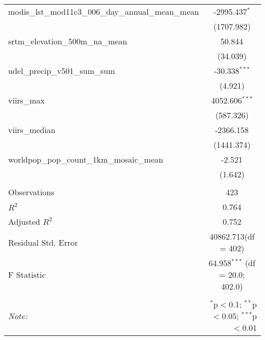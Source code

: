 \begin{table}[!htbp]
\begin{tabular}{@{\extracolsep{5pt}}lc}
 modis_lst_mod11c3_006_day_annual_mean_mean & -2995.437$^{*}$ \\
  & (1707.982) \\
 srtm_elevation_500m_na_mean & 50.844$^{}$ \\
  & (34.039) \\
 udel_precip_v501_sum_sum & -30.338$^{***}$ \\
  & (4.921) \\
 viirs_max & 4052.606$^{***}$ \\
  & (587.326) \\
 viirs_median & -2366.158$^{}$ \\
  & (1441.374) \\
 worldpop_pop_count_1km_mosaic_mean & -2.521$^{}$ \\
  & (1.642) \\
\hline \\[-1.8ex]
 Observations & 423 \\
 $R^2$ & 0.764 \\
 Adjusted $R^2$ & 0.752 \\
 Residual Std. Error & 40862.713(df = 402)  \\
 F Statistic & 64.958$^{***}$ (df = 20.0; 402.0) \\
\hline
\hline \\[-1.8ex]
\textit{Note:} & \multicolumn{1}{r}{$^{*}$p$<$0.1; $^{**}$p$<$0.05; $^{***}$p$<$0.01} \\
\end{tabular}
\end{table}